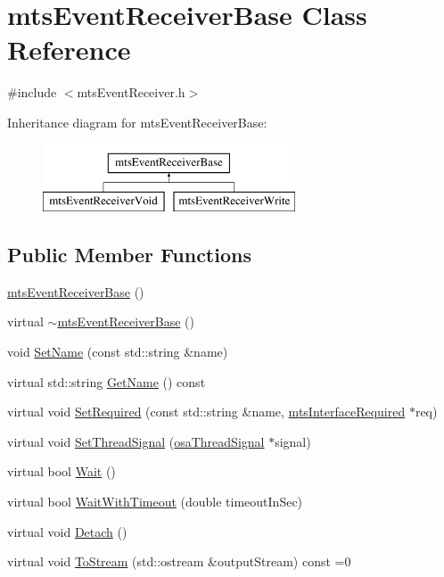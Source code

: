 \hypertarget{classmts_event_receiver_base}{}\section{mts\+Event\+Receiver\+Base Class Reference}
\label{classmts_event_receiver_base}


{\ttfamily \#include $<$mts\+Event\+Receiver.\+h$>$}

Inheritance diagram for mts\+Event\+Receiver\+Base\+:\begin{figure}[H]
\begin{center}
\leavevmode
\includegraphics[height=2.000000cm]{dd/d13/classmts_event_receiver_base}
\end{center}
\end{figure}
\subsection*{Public Member Functions}
\begin{DoxyCompactItemize}
\item 
\hyperlink{classmts_event_receiver_base_ab314727db9aa9d80b01613de9a1a42d2}{mts\+Event\+Receiver\+Base} ()
\item 
virtual \hyperlink{classmts_event_receiver_base_ae60b84761a92809602795db3926b6c8e}{$\sim$mts\+Event\+Receiver\+Base} ()
\item 
void \hyperlink{classmts_event_receiver_base_a39498e4110e83c9b56a4906f1bac0995}{Set\+Name} (const std\+::string \&name)
\item 
virtual std\+::string \hyperlink{classmts_event_receiver_base_ae2e86b90ec87705a2555a6527db7750d}{Get\+Name} () const 
\item 
virtual void \hyperlink{classmts_event_receiver_base_a4665b40af0624b4b0a7c6d68b48b48d2}{Set\+Required} (const std\+::string \&name, \hyperlink{classmts_interface_required}{mts\+Interface\+Required} $\ast$req)
\item 
virtual void \hyperlink{classmts_event_receiver_base_a4f25888766923d3817be765ec69732ea}{Set\+Thread\+Signal} (\hyperlink{classosa_thread_signal}{osa\+Thread\+Signal} $\ast$signal)
\item 
virtual bool \hyperlink{classmts_event_receiver_base_aa866c97b0b386de71abf81fa5d11af4e}{Wait} ()
\item 
virtual bool \hyperlink{classmts_event_receiver_base_a07beefc75c0793e2c7b4255d10e4a3b9}{Wait\+With\+Timeout} (double timeout\+In\+Sec)
\item 
virtual void \hyperlink{classmts_event_receiver_base_ad8144eb2b093d1675755080af1e117ef}{Detach} ()
\item 
virtual void \hyperlink{classmts_event_receiver_base_a6c967920dab912f8126448c28f7e6c44}{To\+Stream} (std\+::ostream \&output\+Stream) const =0
\end{DoxyCompactItemize}
